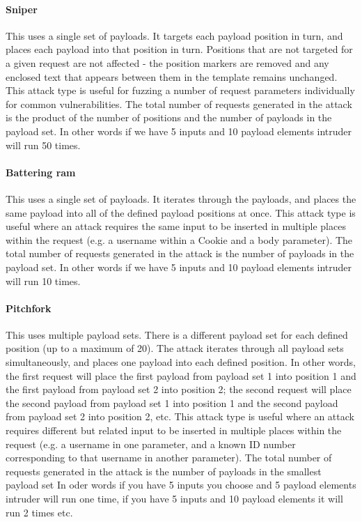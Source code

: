 \documentclass{article}[12pt]
\begin{document}
\paragraph{Sniper}
This uses a single set of payloads.
It targets each payload position in turn, and places each payload into that position in turn.
Positions that are not targeted for a given request are not affected - the position markers are removed and any enclosed text that appears between them in the template remains unchanged.
This attack type is useful for fuzzing a number of request parameters individually for common vulnerabilities.
The total number of requests generated in the attack is the product of the number of positions and the number of payloads in the payload set.
In other words if we have 5 inputs and 10 payload elements intruder will run 50 times.
\paragraph{Battering ram}
This uses a single set of payloads.
It iterates through the payloads, and places the same payload into all of the defined payload positions at once.
This attack type is useful where an attack requires the same input to be inserted in multiple places within the request (e.g. a username within a Cookie and a body parameter).
The total number of requests generated in the attack is the number of payloads in the payload set.
In other words if we have 5 inputs and 10 payload elements intruder will run 10 times.
\paragraph{Pitchfork}
This uses multiple payload sets.
There is a different payload set for each defined position (up to a maximum of 20).
The attack iterates through all payload sets simultaneously, and places one payload into each defined position.
In other words, the first request will place the first payload from payload set 1 into position 1 and the first payload from payload set 2 into position 2;
the second request will place the second payload from payload set 1 into position 1 and the second payload from payload set 2 into position 2, etc.
This attack type is useful where an attack requires different but related input to be inserted in multiple places within the request (e.g. a username in one parameter, and a known ID number corresponding to that username in another parameter).
The total number of requests generated in the attack is the number of payloads in the smallest payload set
In oder words if you have 5 inputs you choose and 5  payload elements intruder will run one time, if you have 5 inputs and 10 payload elements it will run 2 times etc.
\end{document}
